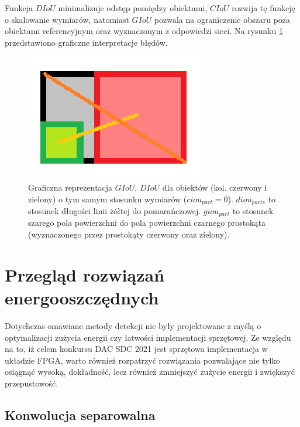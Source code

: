 Funkcja $DIoU$ minimalizuje odstęp pomiędzy obiektami, $CIoU$ rozwija tę funkcję o skalowanie wymiarów, natomiast $GIoU$ pozwala na ograniczenie obszaru poza obiektami referencyjnym oraz wyznaczonym z odpowiedzi sieci.
Na rysunku \ref{fig:iou_losses} przedstawiono graficzne interpretacje błędów.


\begin{figure}
    \centering
     \includegraphics[width=0.4\linewidth]{images/gcdiou.png}
    \caption{ Graficzna reprezentacja $GIoU$, $DIoU$ dla obiektów (kol. czerwony i zielony) o tym samym stosunku wymiarów ($ciou_{part} = 0$). $diou_{parts}$ to stosunek długości linii żółtej do pomarańczowej. $giou_{part}$ to stosunek szarego pola powierzchni do pola powierzchni czarnego prostokąta (wyznaczonego przez prostokąty czerwony oraz zielony).}
    \label{fig:iou_losses}
\end{figure}

\section{Przegląd rozwiązań energooszczędnych}

Dotychczas omawiane metody detekcji nie były projektowane z myślą o optymalizacji zużycia energii czy łatwości implementacji sprzętowej. 
Ze względu na to, iż celem konkursu DAC SDC 2021 jest sprzętowa implementacja w układzie FPGA, warto również rozpatrzyć rozwiązania pozwalające nie tylko osiągnąć wysoką, dokładność, lecz również zmniejszyć zużycie energii i zwiększyć przepustowość.

\subsection{Konwolucja separowalna}
\label{subsec:sep_conv}

